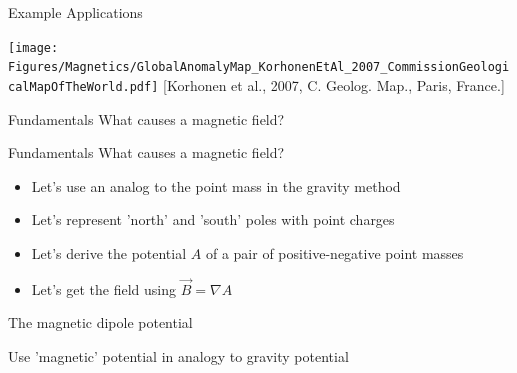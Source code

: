 \begin{frame}
  \begin{PointSix}{Example Applications}
    
    \texttt{[image: Figures/Magnetics/GlobalAnomalyMap\_KorhonenEtAl\_2007\_CommissionGeologicalMapOfTheWorld.pdf]}
    \tiny [Korhonen et al., 2007, C. Geolog. Map., Paris, France.]
  \end{PointSix}
\end{frame}

\begin{frame}
  \begin{PointSix}{Fundamentals}
    What causes a magnetic field? 
  \end{PointSix}
\end{frame}

\begin{frame}
  \begin{PointSix}{Fundamentals}
    What causes a magnetic field?
    \begin{itemize}
      \item Let's use an analog to the point mass in the gravity method
      \item Let's represent 'north' and 'south' poles with point charges
      \item Let's derive the potential $A$ of a pair of positive-negative point masses
      \item Let's get the field using $\vec{B} = \nabla A$
    \end{itemize} 
  \end{PointSix}
\end{frame}

\begin{frame}
  \begin{PointSix}{The magnetic dipole potential}

  \small Use 'magnetic' potential in analogy to gravity potential
  \end{PointSix}
\end{frame}


